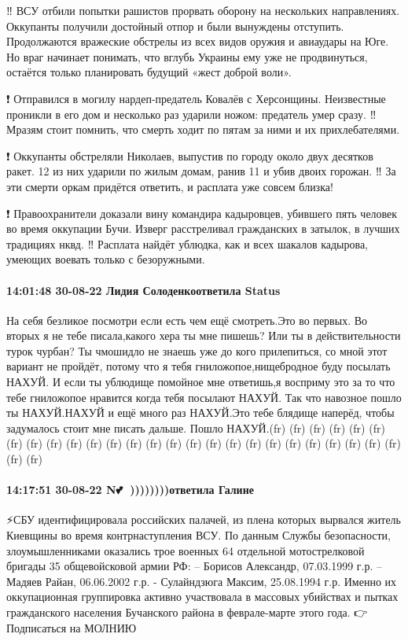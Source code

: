 ‼ ВСУ отбили попытки рашистов прорвать оборону на нескольких направлениях.
Оккупанты получили достойный отпор и были вынуждены отступить. Продолжаются
вражеские обстрелы из всех видов оружия и авиаудары на Юге. Но враг начинает
понимать, что вглубь Украины ему уже не продвинуться, остаётся только
планировать будущий «жест доброй воли».

❗ Отправился в могилу нардеп-предатель Ковалёв с Херсонщины. Неизвестные
проникли в его дом и несколько раз ударили ножом: предатель умер сразу. ‼
Мразям стоит помнить, что смерть ходит по пятам за ними и их прихлебателями.

❗ Оккупанты обстреляли Николаев, выпустив по городу около двух десятков ракет.
12 из них ударили по жилым домам, ранив 11 и убив двоих горожан. ‼ За эти
смерти оркам придётся ответить, и расплата уже совсем близка!

❗ Правоохранители доказали вину командира кадыровцев, убившего пять человек во
время оккупации Бучи. Изверг расстреливал гражданских в затылок, в лучших
традициях нквд. ‼ Расплата найдёт ублюдка, как и всех шакалов кадырова, умеющих
воевать только с безоружными.

\paragraph{14:01:48 30-08-22 Лидия Солоденкоответила Status}

На себя безликое посмотри если есть чем ещё смотреть.Это во первых. Во вторых я не тебе писала,какого хера ты мне пишешь? Или ты в действительности турок чурбан?
Ты чмошидло не знаешь уже до кого прилепиться, со мной этот вариант не пройдёт, потому что я тебя гниложопое,нищебродное буду посылать НАХУЙ.
И если ты ублюдище помойное мне ответишь,я восприму это за то что тебе гниложопое нравится когда тебя посылают НАХУЙ. Так что навозное пошло ты НАХУЙ.НАХУЙ и ещё много раз НАХУЙ.Это тебе блядище наперёд, чтобы задумалось стоит мне писать дальше.
Пошло НАХУЙ.(fr) (fr) (fr) (fr) (fr) (fr) (fr) (fr) (fr) (fr) (fr) (fr) (fr) (fr) (fr) (fr) (fr) (fr) (fr) (fr) (fr) (fr) (fr) (fr) (fr) (fr) (fr) (fr) 

\paragraph{14:17:51 30-08-22 N💕🌹 ))))))))ответила Галине}

⚡️СБУ идентифицировала российских палачей, из плена которых вырвался житель Киевщины во время контрнаступления ВСУ.
По данным Службы безопасности, злоумышленниками оказались трое военных 64 отдельной мотострелковой бригады 35 общевойсковой армии РФ:
– Борисов Александр, 07.03.1999 г.р.
– Мадяев Райан, 06.06.2002 г.р.
- Сулайндзюга Максим, 25.08.1994 г.р.
Именно их оккупационная группировка активно участвовала в массовых убийствах и пытках гражданского населения Бучанского района в феврале-марте этого года.
👉Подписаться на МОЛНИЮ

